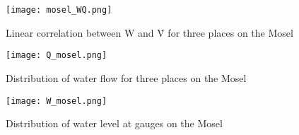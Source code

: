 \begin{figure}[H]
\centering
\texttt{[image: mosel\_WQ.png]}
\caption[Linear correlation between W and  \.{V} for three places on the Mosel]{Linear correlation between W and  \.{V} for three places on the Mosel}
\label{mosel_WQ}
\end{figure}

\begin{figure}[H]
\centering
\texttt{[image: Q\_mosel.png]}
\caption[Distribution of water flow for three places on the Mosel]{Distribution of water flow for three places on the Mosel}
\label{Q_mosel}
\end{figure}

\begin{figure}[H]
\centering
\texttt{[image: W\_mosel.png]}
\caption[Distribution of water level at gauges on the Mosel]{Distribution of water level at gauges on the Mosel}
\label{W_mosel}
\end{figure}

